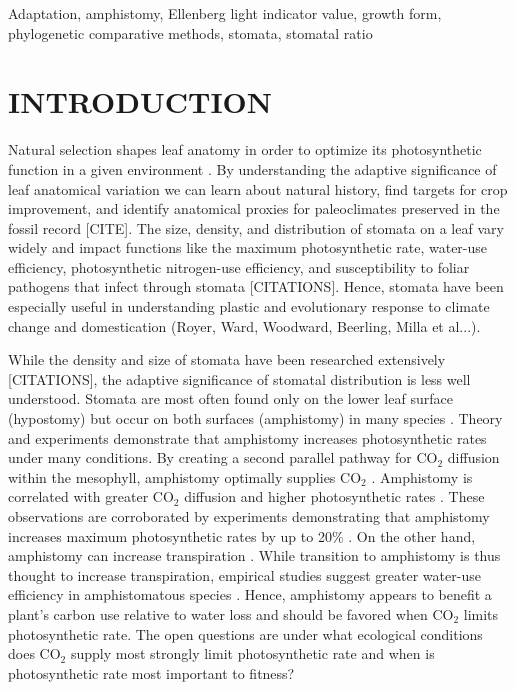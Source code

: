 \documentclass[12pt, oneside]{article}
\begin{document}
Adaptation, amphistomy, Ellenberg light indicator value, growth form, phylogenetic comparative methods, stomata, stomatal ratio

\section*{INTRODUCTION}

Natural selection shapes leaf anatomy in order to optimize its photosynthetic function in a given environment \citep{Haberlandt_1914, Givnish_1987, Smith_etal_1997}. By understanding the adaptive significance of leaf anatomical variation we can learn about natural history, find targets for crop improvement, and identify anatomical proxies for paleoclimates preserved in the fossil record [CITE]. The size, density, and distribution of stomata on a leaf vary widely and impact functions like the maximum photosynthetic rate, water-use efficiency, photosynthetic nitrogen-use efficiency, and susceptibility to foliar pathogens that infect through stomata [CITATIONS]. Hence, stomata have been especially useful in understanding plastic and evolutionary response to climate change and domestication (Royer, Ward, Woodward, Beerling, Milla et al...).

While the density and size of stomata have been researched extensively [CITATIONS], the adaptive significance of stomatal distribution is less well understood. Stomata are most often found only on the lower leaf surface (hypostomy) but occur on both surfaces (amphistomy) in many species \citep{Metcalfe_Chalk_1950, Parkhurst_1978, Mott_etal_1982}. Theory and experiments demonstrate that amphistomy increases photosynthetic rates under many conditions. By creating a second parallel pathway for CO$_2$ diffusion within the mesophyll, amphistomy optimally supplies CO$_2$ \citep{Parkhurst_1978, Gutschick_1984b, Jones_1985}. Amphistomy is correlated with greater CO$_2$ diffusion \citep{Beerling_Kelly_1996} and higher photosynthetic rates \citep{Mckown_etal_2014}. These observations are corroborated by experiments demonstrating that amphistomy increases maximum photosynthetic rates by up to 20\% \citep{Parkhurst_Mott_1990}. On the other hand, amphistomy can increase transpiration \citep{Jones_1985, Foster_Smith_1986, Buckley_etal_2015}. While transition to amphistomy is thus thought to increase transpiration, empirical studies suggest greater water-use efficiency in amphistomatous species \citep{Bucher_etal_2017}. Hence, amphistomy appears to benefit a plant's carbon use relative to water loss and should be favored when CO$_2$ limits photosynthetic rate. The open questions are under what ecological conditions does CO$_2$ supply most strongly limit photosynthetic rate \citep{Peat_Fitter_1994b} and when is photosynthetic rate most important to fitness?
\end{document}
